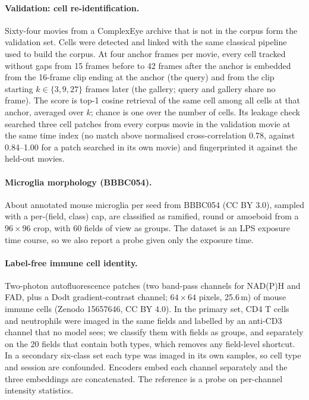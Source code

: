 \paragraph{Validation: cell re-identification.}
\label{sec:validation}
Sixty-four movies from a ComplexEye archive that is not in the corpus form the validation
set. Cells were detected and linked with the same classical pipeline used to build the
corpus. At four anchor frames per movie, every cell tracked without gaps from 15 frames
before to 42 frames after the anchor is embedded from the 16-frame clip ending at the
anchor (the query) and from the clip starting $k\in\{3,9,27\}$ frames later (the gallery;
query and gallery share no frame). The score is top-1 cosine retrieval of the same cell
among all cells at that anchor, averaged over $k$; chance is one over the number of cells.
Its leakage check searched three cell patches from every corpus movie in the validation
movie at the same time index (no match above normalised cross-correlation 0.78, against
0.84--1.00 for a patch searched in its own movie) and fingerprinted it against the held-out
movies.

\paragraph{Microglia morphology (BBBC054).}
About  annotated mouse microglia per seed from BBBC054
\citep{bbbc} (CC BY 3.0), sampled with a per-(field, class) cap, are classified as
ramified, round or amoeboid from a $96\times96$ crop, with 60 fields of view as groups. The
dataset is an LPS exposure time course, so we also report a probe given only the exposure
time.

\paragraph{Label-free immune cell identity.}
Two-photon autofluorescence patches (two band-pass channels for NAD(P)H and FAD, plus a
Dodt gradient-contrast channel; $64\times64$ pixels, 25.6\,\textmu m) of mouse immune cells
\citep{kreiss2026cellmics} (Zenodo 15657646, CC BY 4.0). In the primary set, CD4 T cells
and neutrophils were imaged in the same fields and labelled by an anti-CD3 channel that no
model sees; we classify them with fields as groups, and separately on the 20 fields that
contain both types, which removes any field-level shortcut. In a secondary six-class set
each type was imaged in its own samples, so cell type and session are confounded.
Encoders embed each channel separately and the three embeddings are concatenated. The
reference is a probe on per-channel intensity statistics.

